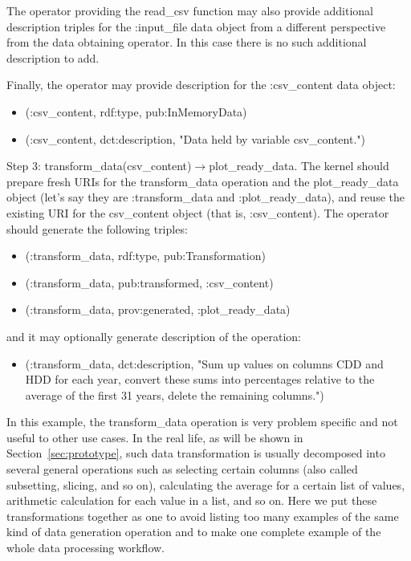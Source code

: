 The operator providing the read\_csv function may also provide additional description triples for the :input\_file data object from a different perspective from the data obtaining operator. In this case there is no such additional description to add.

Finally, the operator may provide description for the :csv\_content data object:
\begin{itemize}
	\item (:csv\_content, rdf:type, pub:InMemoryData)
	\item (:csv\_content, dct:description, "Data held by variable csv\_content.")
\end{itemize}

Step 3: transform\_data(csv\_content)$\rightarrow$plot\_ready\_data. The kernel should prepare fresh URIs for the transform\_data operation and the plot\_ready\_data object (let's say they are :transform\_data and :plot\_ready\_data), and reuse the existing URI for the csv\_content object (that is, :csv\_content). The operator should generate the following triples:
\begin{itemize}
	\item (:transform\_data, rdf:type, pub:Transformation)
	\item (:transform\_data, pub:transformed, :csv\_content)
	\item (:transform\_data, prov:generated, :plot\_ready\_data)
\end{itemize}
and it may optionally generate description of the operation:
\begin{itemize}
	\item (:transform\_data, dct:description, "Sum up values on columns CDD and HDD for each year, convert these sums into percentages relative to the average of the first 31 years, delete the remaining columns.")
\end{itemize}
In this example, the transform\_data operation is very problem specific and not useful to other use cases. In the real life, as will be shown in Section~\ref{sec:prototype}, such data transformation is usually decomposed into several general operations such as selecting certain columns (also called subsetting, slicing, and so on), calculating the average for a certain list of values, arithmetic calculation for each value in a list, and so on. Here we put these transformations together as one to avoid listing too many examples of the same kind of data generation operation and to make one complete example of the whole data processing workflow.

